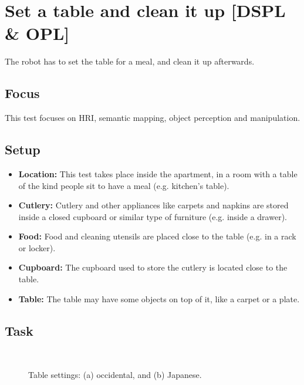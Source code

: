 \section{Set a table and clean it up [DSPL \& OPL]}
The robot has to set the table for a meal, and clean it up afterwards.

\subsection{Focus}
This test focuses on HRI, semantic mapping, object perception and manipulation.

\subsection{Setup}
\begin{itemize}
	\item \textbf{Location:} This test takes place inside the apartment, in a room with a table of the kind people sit to have a meal (e.g. kitchen's table).
	\item \textbf{Cutlery:} Cutlery and other appliances like carpets and napkins are stored inside a closed cupboard or similar type of furniture (e.g. inside a drawer).
	\item \textbf{Food:} Food and cleaning utensils are placed close to the table (e.g. in a rack or locker).
	\item \textbf{Cupboard:} The cupboard used to store the cutlery is located close to the table.
	\item \textbf{Table:} The table may have some objects on top of it, like a carpet or a plate.
\end{itemize}

\subsection{Task}
\label{sattu:task}
\begin{figure}[h!]
	\centering
	 ~
	\caption{Table settings: (a) occidental, and (b) Japanese.}
	\label{fig:arena}
\end{figure}

